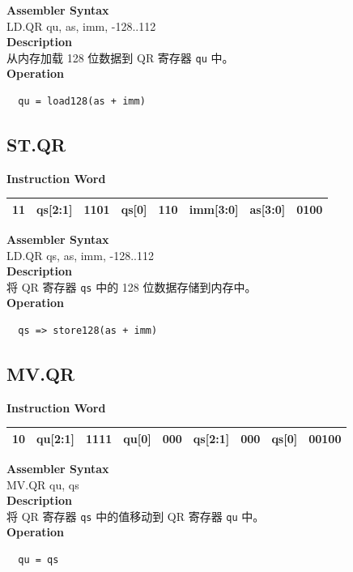 \textbf{Assembler Syntax} \\
LD.QR qu, as, imm, -128..112  \\
\textbf{Description} \\
从内存加载 128 位数据到 QR 寄存器 \lstinline{qu} 中。\\
\textbf{Operation}
\begin{lstlisting}
  qu = load128(as + imm)
\end{lstlisting}

\clearpage
\subsection{ST.QR}\label{instruction:STQR}
\setlength\tabcolsep{6pt}
\textbf{Instruction Word} \\
\begin{tabular}{|c|c|c|c|c|c|c|c|}
  \hline
  11 & qs[2:1] & 1101 & qs[0] & 110 & imm[3:0] & as[3:0] & 0100 \\
  \hline
\end{tabular}

\textbf{Assembler Syntax} \\
LD.QR qs, as, imm, -128..112  \\
\textbf{Description} \\
将 QR 寄存器 \lstinline{qs} 中的 128 位数据存储到内存中。\\
\textbf{Operation}
\begin{lstlisting}
  qs => store128(as + imm)
\end{lstlisting}


\clearpage
\subsection{MV.QR}\label{instruction:MVQR}
\setlength\tabcolsep{6pt}
\textbf{Instruction Word} \\
\begin{tabular}{|c|c|c|c|c|c|c|c|c|}
  \hline
  10 & qu[2:1] & 1111 & qu[0] & 000 & qs[2:1] & 000 & qs[0] & 00100 \\
  \hline
\end{tabular}

\textbf{Assembler Syntax} \\
MV.QR qu, qs \\
\textbf{Description} \\
将 QR 寄存器 \lstinline{qs} 中的值移动到 QR 寄存器 \lstinline{qu} 中。\\
\textbf{Operation}
\begin{lstlisting}
  qu = qs
\end{lstlisting}
